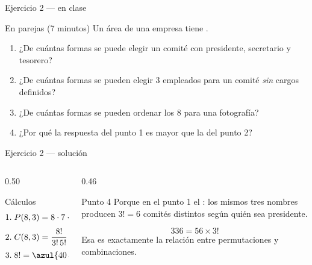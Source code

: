 \documentclass[aspectratio=169,10pt]{beamer}
\begin{document}
\begin{frame}{Ejercicio 2 — en clase}
  \begin{alertblock}{En parejas (7 minutos)}
    Un área de una empresa tiene .

    \vspace{0.3cm}
    \begin{enumerate}
      \item ¿De cuántas formas se puede elegir un comité con presidente,
            secretario y tesorero?
      \item ¿De cuántas formas se pueden elegir 3 empleados para un comité
            \emph{sin} cargos definidos?
      \item ¿De cuántas formas se pueden ordenar los 8 para una fotografía?
      \item ¿Por qué la respuesta del punto 1 es mayor que la del punto 2?
    \end{enumerate}
  \end{alertblock}
\end{frame}

\begin{frame}{Ejercicio 2 — solución}
  \begin{columns}[T,onlytextwidth]
    \begin{column}{0.50\textwidth}
      \begin{block}{Cálculos}
        \small
        \begin{align*}
          \text{1.}\;& P(8,3)=8\cdot 7\cdot 6 = \azul{336}\\[0.25em]
          \text{2.}\;& C(8,3)=\frac{8!}{3!\,5!} = \azul{56}\\[0.25em]
          \text{3.}\;& 8! = \azul{40\,320}
        \end{align*}
      \end{block}
    \end{column}
    \begin{column}{0.46\textwidth}
      \begin{exampleblock}{Punto 4}
        \footnotesize
        Porque en el punto 1 el : los mismos tres nombres
        producen $3!=6$ comités distintos según quién sea presidente.

        \vspace{0.2cm}
        \[ 336 = 56 \times 3! \]
        Esa es exactamente la relación entre permutaciones y combinaciones.
      \end{exampleblock}
    \end{column}
  \end{columns}
\end{frame}
\end{document}
